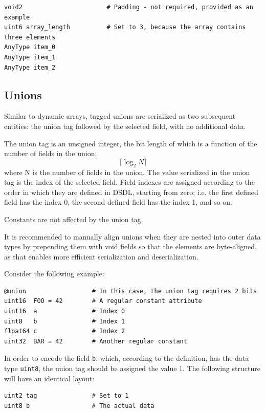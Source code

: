 \begin{verbatim}
void2                       # Padding - not required, provided as an example
uint6 array_length          # Set to 3, because the array contains three elements
AnyType item_0
AnyType item_1
AnyType item_2
\end{verbatim}

\subsection{Unions}

Similar to dynamic arrays, tagged unions are serialized as two subsequent entities:
the union tag followed by the selected field, with no additional data.

The union tag is an unsigned integer, the bit length of which is a function of the number of fields in the union:
$$\lceil{}\log_2 N\rceil{}$$
where N is the number of fields in the union.
The value serialized in the union tag is the index of the selected field.
Field indexes are assigned according to the order in which they are defined in DSDL,
starting from zero;
i.e. the first defined field has the index 0, the second defined field has the index 1, and so on.

Constants are not affected by the union tag.

It is recommended to manually align unions when they are nested into outer data types by
prepending them with void fields so that the elements are byte-aligned,
as that enables more efficient serialization and deserialization.

Consider the following example:

\begin{verbatim}
@union                  # In this case, the union tag requires 2 bits
uint16  FOO = 42        # A regular constant attribute
uint16  a               # Index 0
uint8   b               # Index 1
float64 c               # Index 2
uint32  BAR = 42        # Another regular constant
\end{verbatim}

In order to encode the field \verb|b|, which, according to the definition,
has the data type \verb|uint8|, the union tag should be assigned the value 1.
The following structure will have an identical layout:

\begin{verbatim}
uint2 tag               # Set to 1
uint8 b                 # The actual data
\end{verbatim}

